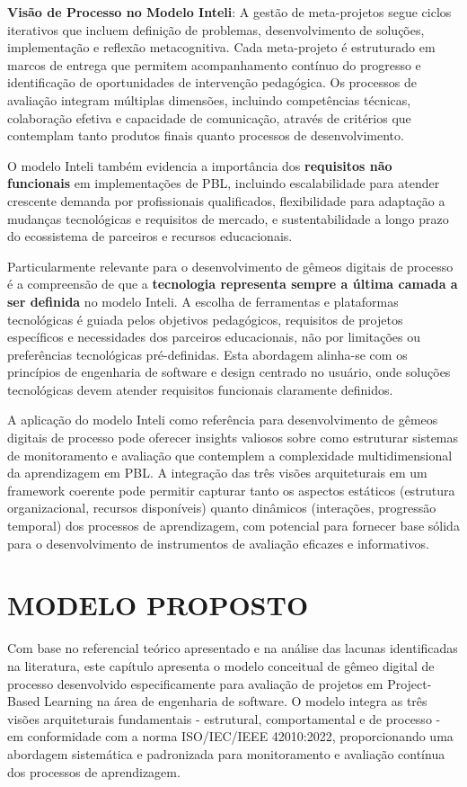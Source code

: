 \documentclass[12pt,a4paper]{article}
\begin{document}
\textbf{Visão de Processo no Modelo Inteli}: A gestão de meta-projetos segue ciclos iterativos que incluem definição de problemas, desenvolvimento de soluções, implementação e reflexão metacognitiva. Cada meta-projeto é estruturado em marcos de entrega que permitem acompanhamento contínuo do progresso e identificação de oportunidades de intervenção pedagógica. Os processos de avaliação integram múltiplas dimensões, incluindo competências técnicas, colaboração efetiva e capacidade de comunicação, através de critérios que contemplam tanto produtos finais quanto processos de desenvolvimento.

O modelo Inteli também evidencia a importância dos \textbf{requisitos não funcionais} em implementações de PBL, incluindo escalabilidade para atender crescente demanda por profissionais qualificados, flexibilidade para adaptação a mudanças tecnológicas e requisitos de mercado, e sustentabilidade a longo prazo do ecossistema de parceiros e recursos educacionais.

Particularmente relevante para o desenvolvimento de gêmeos digitais de processo é a compreensão de que a \textbf{tecnologia representa sempre a última camada a ser definida} no modelo Inteli. A escolha de ferramentas e plataformas tecnológicas é guiada pelos objetivos pedagógicos, requisitos de projetos específicos e necessidades dos parceiros educacionais, não por limitações ou preferências tecnológicas pré-definidas. Esta abordagem alinha-se com os princípios de engenharia de software e design centrado no usuário, onde soluções tecnológicas devem atender requisitos funcionais claramente definidos.

A aplicação do modelo Inteli como referência para desenvolvimento de gêmeos digitais de processo pode oferecer insights valiosos sobre como estruturar sistemas de monitoramento e avaliação que contemplem a complexidade multidimensional da aprendizagem em PBL. A integração das três visões arquiteturais em um framework coerente pode permitir capturar tanto os aspectos estáticos (estrutura organizacional, recursos disponíveis) quanto dinâmicos (interações, progressão temporal) dos processos de aprendizagem, com potencial para fornecer base sólida para o desenvolvimento de instrumentos de avaliação eficazes e informativos.

\section{MODELO PROPOSTO}

Com base no referencial teórico apresentado e na análise das lacunas identificadas na literatura, este capítulo apresenta o modelo conceitual de gêmeo digital de processo desenvolvido especificamente para avaliação de projetos em Project-Based Learning na área de engenharia de software. O modelo integra as três visões arquiteturais fundamentais - estrutural, comportamental e de processo - em conformidade com a norma ISO/IEC/IEEE 42010:2022, proporcionando uma abordagem sistemática e padronizada para monitoramento e avaliação contínua dos processos de aprendizagem.
\end{document}
